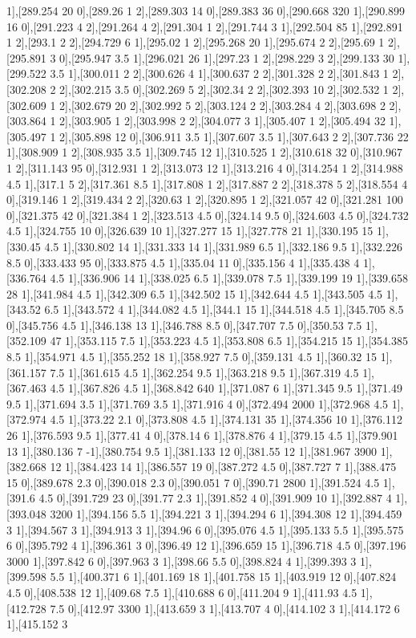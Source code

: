 {1],[289.254 20 0],[289.26 1 2],[289.303 14 0],[289.383 36 0],[290.668 320 1],[290.899 16 0],[291.223 4 2],[291.264 4 2],[291.304 1 2],[291.744 3 1],[292.504 85 1],[292.891 1 2],[293.1 2 2],[294.729 6 1],[295.02 1 2],[295.268 20 1],[295.674 2 2],[295.69 1 2],[295.891 3 0],[295.947 3.5 1],[296.021 26 1],[297.23 1 2],[298.229 3 2],[299.133 30 1],[299.522 3.5 1],[300.011 2 2],[300.626 4 1],[300.637 2 2],[301.328 2 2],[301.843 1 2],[302.208 2 2],[302.215 3.5 0],[302.269 5 2],[302.34 2 2],[302.393 10 2],[302.532 1 2],[302.609 1 2],[302.679 20 2],[302.992 5 2],[303.124 2 2],[303.284 4 2],[303.698 2 2],[303.864 1 2],[303.905 1 2],[303.998 2 2],[304.077 3 1],[305.407 1 2],[305.494 32 1],[305.497 1 2],[305.898 12 0],[306.911 3.5 1],[307.607 3.5 1],[307.643 2 2],[307.736 22 1],[308.909 1 2],[308.935 3.5 1],[309.745 12 1],[310.525 1 2],[310.618 32 0],[310.967 1 2],[311.143 95 0],[312.931 1 2],[313.073 12 1],[313.216 4 0],[314.254 1 2],[314.988 4.5 1],[317.1 5 2],[317.361 8.5 1],[317.808 1 2],[317.887 2 2],[318.378 5 2],[318.554 4 0],[319.146 1 2],[319.434 2 2],[320.63 1 2],[320.895 1 2],[321.057 42 0],[321.281 100 0],[321.375 42 0],[321.384 1 2],[323.513 4.5 0],[324.14 9.5 0],[324.603 4.5 0],[324.732 4.5 1],[324.755 10 0],[326.639 10 1],[327.277 15 1],[327.778 21 1],[330.195 15 1],[330.45 4.5 1],[330.802 14 1],[331.333 14 1],[331.989 6.5 1],[332.186 9.5 1],[332.226 8.5 0],[333.433 95 0],[333.875 4.5 1],[335.04 11 0],[335.156 4 1],[335.438 4 1],[336.764 4.5 1],[336.906 14 1],[338.025 6.5 1],[339.078 7.5 1],[339.199 19 1],[339.658 28 1],[341.984 4.5 1],[342.309 6.5 1],[342.502 15 1],[342.644 4.5 1],[343.505 4.5 1],[343.52 6.5 1],[343.572 4 1],[344.082 4.5 1],[344.1 15 1],[344.518 4.5 1],[345.705 8.5 0],[345.756 4.5 1],[346.138 13 1],[346.788 8.5 0],[347.707 7.5 0],[350.53 7.5 1],[352.109 47 1],[353.115 7.5 1],[353.223 4.5 1],[353.808 6.5 1],[354.215 15 1],[354.385 8.5 1],[354.971 4.5 1],[355.252 18 1],[358.927 7.5 0],[359.131 4.5 1],[360.32 15 1],[361.157 7.5 1],[361.615 4.5 1],[362.254 9.5 1],[363.218 9.5 1],[367.319 4.5 1],[367.463 4.5 1],[367.826 4.5 1],[368.842 640 1],[371.087 6 1],[371.345 9.5 1],[371.49 9.5 1],[371.694 3.5 1],[371.769 3.5 1],[371.916 4 0],[372.494 2000 1],[372.968 4.5 1],[372.974 4.5 1],[373.22 2.1 0],[373.808 4.5 1],[374.131 35 1],[374.356 10 1],[376.112 26 1],[376.593 9.5 1],[377.41 4 0],[378.14 6 1],[378.876 4 1],[379.15 4.5 1],[379.901 13 1],[380.136 7 -1],[380.754 9.5 1],[381.133 12 0],[381.55 12 1],[381.967 3900 1],[382.668 12 1],[384.423 14 1],[386.557 19 0],[387.272 4.5 0],[387.727 7 1],[388.475 15 0],[389.678 2.3 0],[390.018 2.3 0],[390.051 7 0],[390.71 2800 1],[391.524 4.5 1],[391.6 4.5 0],[391.729 23 0],[391.77 2.3 1],[391.852 4 0],[391.909 10 1],[392.887 4 1],[393.048 3200 1],[394.156 5.5 1],[394.221 3 1],[394.294 6 1],[394.308 12 1],[394.459 3 1],[394.567 3 1],[394.913 3 1],[394.96 6 0],[395.076 4.5 1],[395.133 5.5 1],[395.575 6 0],[395.792 4 1],[396.361 3 0],[396.49 12 1],[396.659 15 1],[396.718 4.5 0],[397.196 3000 1],[397.842 6 0],[397.963 3 1],[398.66 5.5 0],[398.824 4 1],[399.393 3 1],[399.598 5.5 1],[400.371 6 1],[401.169 18 1],[401.758 15 1],[403.919 12 0],[407.824 4.5 0],[408.538 12 1],[409.68 7.5 1],[410.688 6 0],[411.204 9 1],[411.93 4.5 1],[412.728 7.5 0],[412.97 3300 1],[413.659 3 1],[413.707 4 0],[414.102 3 1],[414.172 6 1],[415.152 3 }
